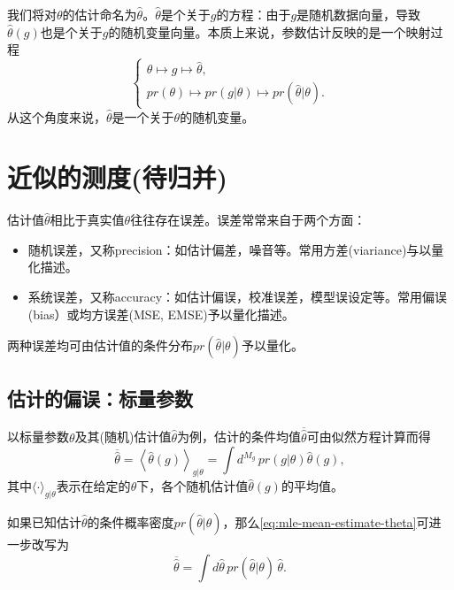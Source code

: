 我们将对$\theta$的估计命名为$\hat{\theta}$。$\hat{\theta}$是个关于$g$的方程：由于$g$是随机数据向量，导致$\hat{\theta}(g)$也是个关于$g$的随机变量向量。本质上来说，参数估计反映的是一个映射过程
\begin{equation*}
  \begin{cases}
    \theta \mapsto g \mapsto \hat{\theta}, \\
    pr(\theta) \mapsto pr(g | \theta) \mapsto pr(\hat{\theta} | \theta).
  \end{cases}
\end{equation*}
从这个角度来说，$\hat{\theta}$是一个关于$\theta$的随机变量。

\section{近似的测度(待归并)}
\label{sec:mle-performance-metrics}
估计值$\hat{\theta}$相比于真实值$\theta$往往存在误差。误差常常来自于两个方面：
\begin{itemize}
  \item 随机误差，又称precision：如估计偏差，噪音等。常用方差(viariance)与以量化描述。
  \item 系统误差，又称accuracy：如估计偏误，校准误差，模型误设定等。常用偏误(bias）或均方误差(MSE, EMSE)予以量化描述。
\end{itemize}
两种误差均可由估计值的条件分布$pr(\hat{\theta} | \theta)$予以量化。

\subsection{估计的偏误：标量参数}
\label{sec:mle-bias-scalar}

以标量参数$\theta$及其(随机)估计值$\hat{\theta}$为例，估计的条件均值$\overline{\hat{\theta}}$可由似然方程计算而得
\begin{equation}
  \label{eq:mle-mean-estimate-theta}
  \overline{\hat{\theta}} =
  \left\langle
  \hat{\theta}(g)
  \right\rangle_{g|\theta}
  = \int d^{M_g} \, pr(g | \theta) \hat{\theta}(g),
\end{equation}
其中$\langle \cdot \rangle_{g|\theta}$表示在给定的$\theta$下，各个随机估计值$\hat{\theta}(g)$的平均值。

如果已知估计$\hat{\theta}$的条件概率密度$pr \left(\hat{\theta} | \theta \right)$，那么\eqref{eq:mle-mean-estimate-theta}可进一步改写为
\begin{equation}
  \label{eq:mle-hat-theta-random}
  \overline{\hat{\theta}} = \int d \hat{\theta} \, pr \left( \hat{\theta} | \theta \right) \, \hat{\theta}.
\end{equation}



